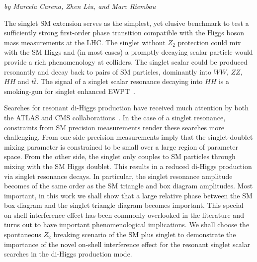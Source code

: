 \begin{center}
    {\it{
 by Marcela Carena, Zhen Liu, and Marc Riembau}}
 \end{center}


The singlet SM extension  serves as the simplest, yet elusive benchmark to test  a sufficiently strong  first-order phase transition compatible with the Higgs boson mass measurements at the LHC.
The singlet without $Z_2$ protection could mix with the SM Higgs and (in most cases) a promptly decaying scalar particle would provide a rich phenomenology at colliders. The singlet scalar could be produced resonantly  and decay back to pairs of SM particles, dominantly into $WW$, $ZZ$, $HH$ and $t\bar t$. The signal of  a singlet scalar resonance decaying into $HH$ is a smoking-gun  for singlet enhanced EWPT~\cite{Chen:2014ask,Dawson:2015haa,Chen:2017qcz,Huang:2017jws,Robens:2016xkb,Lewis:2017dme,Dawson:2016ugw,Huang:2017nnw,deFlorian:2016spz}. 


Searches for resonant di-Higgs production have received much attention by both the ATLAS and CMS collaborations~\cite{Aaboud:2016xco,Aad:2015xja,Sirunyan:2017djm,CMS-PAS-HIG-17-006,CMS-PAS-HIG-17-008,CMS-PAS-HIG-17-009}. In the case of a singlet resonance,  constraints from SM precision measurements  render these searches more challenging. From one side  precision measurements  imply that  the singlet-doublet mixing parameter is constrained to be small over a large region of parameter space.  From the other side, the singlet only couples to SM particles through mixing with the SM Higgs doublet. This results in a reduced di-Higgs production via singlet resonance decays. In particular, the singlet resonance amplitude  becomes of the same order as the SM  triangle  and box diagram amplitudes. Most important, in this work we shall show that a large relative phase between the SM box diagram and the singlet triangle diagram becomes important. This special on-shell interference  effect  has been  commonly overlooked in the literature and turns out to have important phenomenological implications.
We shall choose the spontaneous $Z_2$ breaking scenario of the SM plus singlet to demonstrate the importance of the novel on-shell interference effect for the resonant singlet scalar searches in the di-Higgs production mode.

\label{sec:model}

